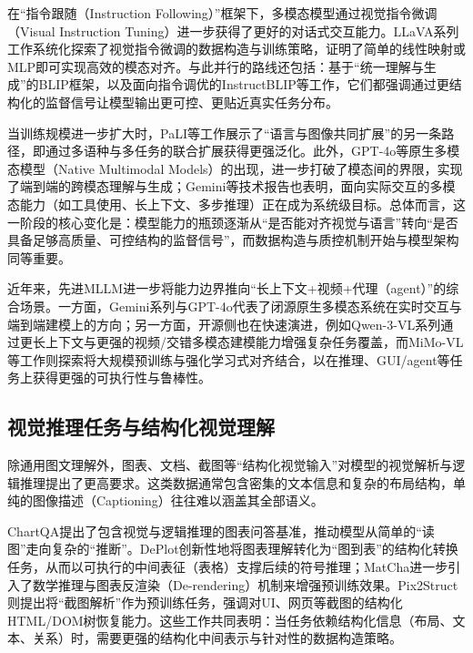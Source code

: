 在“指令跟随（Instruction Following）”框架下，多模态模型通过视觉指令微调（Visual Instruction Tuning）进一步获得了更好的对话式交互能力。LLaVA系列工作系统化探索了视觉指令微调的数据构造与训练策略，证明了简单的线性映射或MLP即可实现高效的模态对齐\citep{liu2024visual,liu2023improved}。与此并行的路线还包括：基于“统一理解与生成”的BLIP框架\citep{li2022blip}，以及面向指令调优的InstructBLIP等工作\citep{dai2023instructblip}，它们都强调通过更结构化的监督信号让模型输出更可控、更贴近真实任务分布。

当训练规模进一步扩大时，PaLI等工作展示了“语言与图像共同扩展”的另一条路径，即通过多语种与多任务的联合扩展获得更强泛化\citep{chen2022pali}。此外，GPT-4o等原生多模态模型（Native Multimodal Models）的出现，进一步打破了模态间的界限，实现了端到端的跨模态理解与生成\citep{openai2024gpt4o}；Gemini等技术报告也表明，面向实际交互的多模态能力（如工具使用、长上下文、多步推理）正在成为系统级目标\citep{team2023gemini}。总体而言，这一阶段的核心变化是：模型能力的瓶颈逐渐从“是否能对齐视觉与语言”转向“是否具备足够高质量、可控结构的监督信号”，而数据构造与质控机制开始与模型架构同等重要。

近年来，先进MLLM进一步将能力边界推向“长上下文+视频+代理（agent）”的综合场景。一方面，Gemini系列与GPT-4o代表了闭源原生多模态系统在实时交互与端到端建模上的方向\citep{team2023gemini,openai2024gpt4o}；另一方面，开源侧也在快速演进，例如Qwen-3-VL系列通过更长上下文与更强的视频/交错多模态建模能力增强复杂任务覆盖\citep{qwen3vl2025}，而MiMo-VL等工作则探索将大规模预训练与强化学习式对齐结合，以在推理、GUI/agent等任务上获得更强的可执行性与鲁棒性\citep{mimovl2025}。

\subsection{视觉推理任务与结构化视觉理解}
除通用图文理解外，图表、文档、截图等“结构化视觉输入”对模型的视觉解析与逻辑推理提出了更高要求。这类数据通常包含密集的文本信息和复杂的布局结构，单纯的图像描述（Captioning）往往难以涵盖其全部语义。

ChartQA提出了包含视觉与逻辑推理的图表问答基准，推动模型从简单的“读图”走向复杂的“推断”\citep{masry2022chartqa}。DePlot创新性地将图表理解转化为“图到表”的结构化转换任务，从而以可执行的中间表征（表格）支撑后续的符号推理\citep{liu2022deplot}；MatCha进一步引入了数学推理与图表反渲染（De-rendering）机制来增强预训练效果\citep{liu2022matcha}。Pix2Struct则提出将“截图解析”作为预训练任务，强调对UI、网页等截图的结构化HTML/DOM树恢复能力\citep{lee2023pix2struct}。这些工作共同表明：当任务依赖结构化信息（布局、文本、关系）时，需要更强的结构化中间表示与针对性的数据构造策略。

